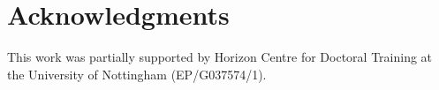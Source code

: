 \documentclass[../main/Feedback.tex]{subfiles}
\begin{document}
\section{Acknowledgments}
This work was partially supported by Horizon Centre for Doctoral Training at the University of Nottingham (EP/G037574/1).
\end{document}
